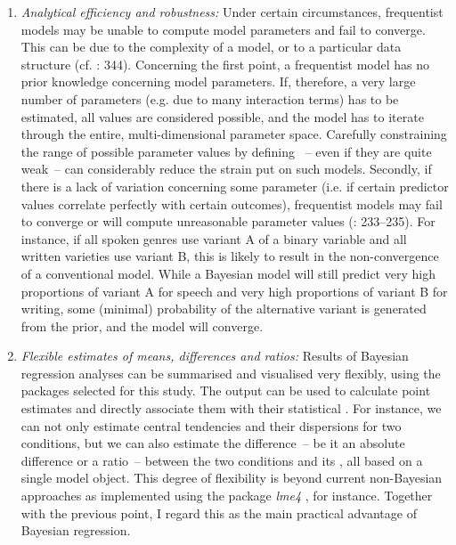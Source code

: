 \begin{enumerate}
\item \textit{Analytical efficiency and robustness:} Under certain circumstances, frequentist models may be unable to compute model parameters and fail to converge. This can be due to the complexity of a model, or to a particular data structure (cf. \citealt{GelmanHill2007}: 344). Concerning the first point, a frequentist model has no prior knowledge concerning model parameters. If, therefore, a very large number of parameters (e.g. due to many interaction terms) has to be estimated, all values are considered possible, and the model has to iterate through the entire, multi-dimensional parameter space. Carefully constraining the range of possible parameter values by defining ~– even if they are quite weak~– can considerably reduce the strain put on such models. Secondly, if there is a lack of variation concerning some parameter (i.e. if certain predictor values correlate perfectly with certain outcomes), frequentist models may fail to converge or will compute unreasonable parameter values (\citealt{Agresti2013}: 233–235). For instance, if all spoken genres use variant A of a binary variable and all written varieties use variant B, this is likely to result in the non-convergence of a conventional model. While a Bayesian model will still predict very high proportions of variant A for speech and very high proportions of variant B for writing, some (minimal) probability of the alternative variant is generated from the prior, and the model will converge.

\item \textit{Flexible estimates of means, differences and ratios:} Results of Bayesian regression analyses can be summarised and visualised very flexibly, using the  packages selected for this study. The output can be used to calculate point estimates and directly associate them with their statistical . For instance, we can not only estimate central tendencies and their dispersions for two conditions, but we can also estimate the difference~– be it an absolute difference or a ratio~– between the two conditions and its , all based on a single model object. This degree of flexibility is beyond current non-Bayesian approaches as implemented using the  package \textit{lme4} \citep{BatesEtAl2020}, for instance. Together with the previous point, I regard this as the main practical advantage of Bayesian regression.
\end{enumerate}

